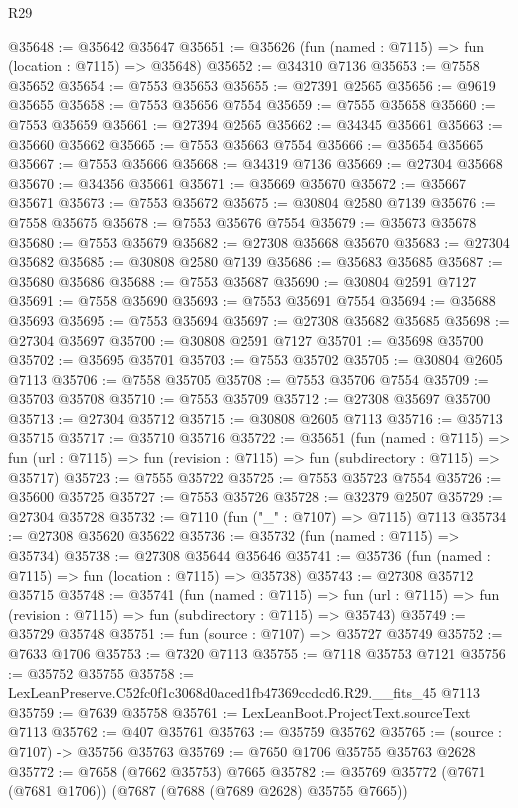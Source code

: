 \begin{lexlean}{R29}
\begin{coremodule}
@35648 := @35642 @35647
@35651 := @35626 (fun (named : @7115) => fun (location : @7115) => @35648)
@35652 := @34310 @7136
@35653 := @7558 @35652
@35654 := @7553 @35653
@35655 := @27391 @2565
@35656 := @9619 @35655
@35658 := @7553 @35656 @7554
@35659 := @7555 @35658
@35660 := @7553 @35659
@35661 := @27394 @2565
@35662 := @34345 @35661
@35663 := @35660 @35662
@35665 := @7553 @35663 @7554
@35666 := @35654 @35665
@35667 := @7553 @35666
@35668 := @34319 @7136
@35669 := @27304 @35668
@35670 := @34356 @35661
@35671 := @35669 @35670
@35672 := @35667 @35671
@35673 := @7553 @35672
@35675 := @30804 @2580 @7139
@35676 := @7558 @35675
@35678 := @7553 @35676 @7554
@35679 := @35673 @35678
@35680 := @7553 @35679
@35682 := @27308 @35668 @35670
@35683 := @27304 @35682
@35685 := @30808 @2580 @7139
@35686 := @35683 @35685
@35687 := @35680 @35686
@35688 := @7553 @35687
@35690 := @30804 @2591 @7127
@35691 := @7558 @35690
@35693 := @7553 @35691 @7554
@35694 := @35688 @35693
@35695 := @7553 @35694
@35697 := @27308 @35682 @35685
@35698 := @27304 @35697
@35700 := @30808 @2591 @7127
@35701 := @35698 @35700
@35702 := @35695 @35701
@35703 := @7553 @35702
@35705 := @30804 @2605 @7113
@35706 := @7558 @35705
@35708 := @7553 @35706 @7554
@35709 := @35703 @35708
@35710 := @7553 @35709
@35712 := @27308 @35697 @35700
@35713 := @27304 @35712
@35715 := @30808 @2605 @7113
@35716 := @35713 @35715
@35717 := @35710 @35716
@35722 := @35651
    (fun (named : @7115) =>
    fun (url : @7115) => fun (revision : @7115) => fun (subdirectory : @7115) => @35717)
@35723 := @7555 @35722
@35725 := @7553 @35723 @7554
@35726 := @35600 @35725
@35727 := @7553 @35726
@35728 := @32379 @2507
@35729 := @27304 @35728
@35732 := @7110 (fun ("_" : @7107) => @7115) @7113
@35734 := @27308 @35620 @35622
@35736 := @35732 (fun (named : @7115) => @35734)
@35738 := @27308 @35644 @35646
@35741 := @35736 (fun (named : @7115) => fun (location : @7115) => @35738)
@35743 := @27308 @35712 @35715
@35748 := @35741
    (fun (named : @7115) =>
    fun (url : @7115) => fun (revision : @7115) => fun (subdirectory : @7115) => @35743)
@35749 := @35729 @35748
@35751 := fun (source : @7107) => @35727 @35749
@35752 := @7633 @1706
@35753 := @7320 @7113
@35755 := @7118 @35753 @7121
@35756 := @35752 @35755
@35758 := LexLeanPreserve.C52fc0f1c3068d0aced1fb47369ccdcd6.R29.__fits_45 @7113
@35759 := @7639 @35758
@35761 := LexLeanBoot.ProjectText.sourceText @7113
@35762 := @407 @35761
@35763 := @35759 @35762
@35765 := (source : @7107) -> @35756 @35763
@35769 := @7650 @1706 @35755 @35763 @2628
@35772 := @7658 (@7662 @35753) @7665
@35782 := @35769 @35772 (@7671 (@7681 @1706)) (@7687 (@7688 (@7689 @2628) @35755 @7665))

\end{coremodule}
\end{lexlean}
